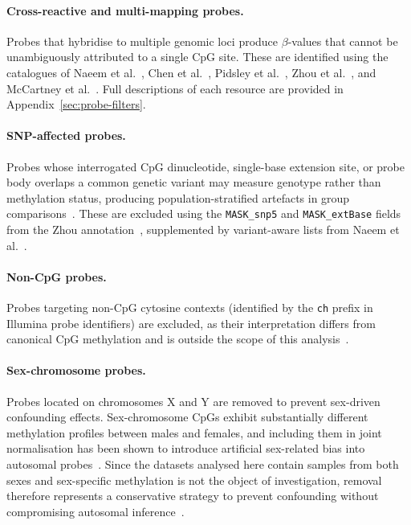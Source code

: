 \paragraph{Cross-reactive and multi-mapping probes.} Probes that 
hybridise to multiple genomic loci produce $\beta$-values that cannot 
be unambiguously attributed to a single CpG site. These are identified 
using the catalogues of Naeem et al.~\cite{naeem2014}, Chen et 
al.~\cite{chen2013}, Pidsley et al.~\cite{Pidsley2016}, Zhou et 
al.~\cite{zhou2016}, and McCartney et al.~\cite{mccartney2016}. Full 
descriptions of each resource are provided in Appendix~\ref{sec:probe-filters}.

\paragraph{SNP-affected probes.} Probes whose interrogated CpG 
dinucleotide, single-base extension site, or probe body overlaps a 
common genetic variant may measure genotype rather than methylation 
status, producing population-stratified artefacts in group 
comparisons~\cite{zhou2016, Pidsley2016}. These are excluded using the 
\texttt{MASK\_snp5} and \texttt{MASK\_extBase} fields from the Zhou 
annotation~\cite{zhou2016}, supplemented by variant-aware lists from 
Naeem et al.~\cite{naeem2014}.

\paragraph{Non-CpG probes.} Probes targeting non-CpG cytosine contexts 
(identified by the \texttt{ch} prefix in Illumina probe identifiers) are 
excluded, as their interpretation differs from canonical CpG methylation 
and is outside the scope of this analysis~\cite{zhou2016, Pidsley2016}.

\paragraph{Sex-chromosome probes.} Probes located on chromosomes X and Y 
are removed to prevent sex-driven confounding effects. Sex-chromosome 
CpGs exhibit substantially different methylation profiles between males 
and females, and including them in joint normalisation has been shown to 
introduce artificial sex-related bias into autosomal 
probes~\cite{Wang2022InterpolatedXY}. Since the datasets analysed here contain samples 
from both sexes and sex-specific methylation is not the object of 
investigation, removal therefore represents a conservative strategy to prevent confounding without compromising autosomal inference~\cite{maksimovic2012}.

